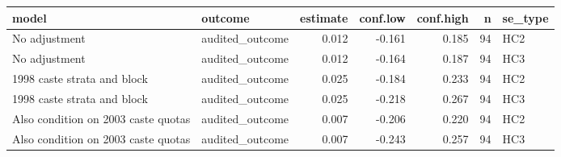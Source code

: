 
\begin{tabular}{llrrrrl}
\toprule
model & outcome & estimate & conf.low & conf.high & n & se\_type\\
\midrule
No adjustment & audited\_outcome & 0.012 & -0.161 & 0.185 & 94 & HC2\\
No adjustment & audited\_outcome & 0.012 & -0.164 & 0.187 & 94 & HC3\\
1998 caste strata and block & audited\_outcome & 0.025 & -0.184 & 0.233 & 94 & HC2\\
1998 caste strata and block & audited\_outcome & 0.025 & -0.218 & 0.267 & 94 & HC3\\
Also condition on 2003 caste quotas & audited\_outcome & 0.007 & -0.206 & 0.220 & 94 & HC2\\
\addlinespace
Also condition on 2003 caste quotas & audited\_outcome & 0.007 & -0.243 & 0.257 & 94 & HC3\\
\bottomrule
\end{tabular}
